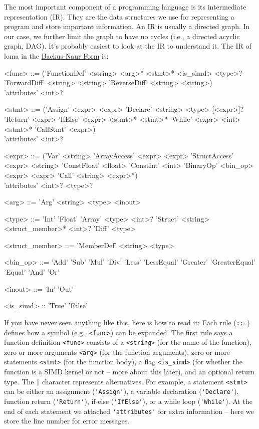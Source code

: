 The most important component of a programming language is its intermediate representation (IR). They are the data structures we use for representing a program and store important information. An IR is usually a directed graph. In our case, we further limit the graph to have no cycles (i.e., a directed acyclic graph, DAG). It's probably easiest to look at the IR to understand it. 
The IR of loma in the \href{https://en.wikipedia.org/wiki/Backus%E2%80%93Naur_form}{Backus-Naur Form} is:
\begin{grammar}
<func> ::= ('FunctionDef' <string> <arg>* <stmt>* <is_simd> <type>?
\alt 'ForwardDiff' <string> <string>
\alt 'ReverseDiff' <string> <string>) \\
'attributes' <int>?

<stmt> ::= ('Assign' <expr> <expr>
\alt 'Declare' <string> <type> [<expr>]? 
\alt 'Return' <expr>
\alt 'IfElse' <expr> <stmt>* <stmt>*
\alt 'While' <expr> <int> <stmt>*
\alt 'CallStmt' <expr>) \\
'attributes' <int>?

<expr> ::= ('Var' <string>
\alt 'ArrayAccess' <expr> <expr>
\alt 'StructAccess' <expr> <string>
\alt 'ConstFloat' <float>
\alt 'ConstInt' <int>
\alt 'BinaryOp' <bin_op> <expr> <expr>
\alt 'Call' <string> <expr>*) \\
'attributes' <int>? <type>?

<arg> ::= 'Arg' <string> <type> <inout>

<type> ::= 'Int'
\alt 'Float'
\alt 'Array' <type> <int>?
\alt 'Struct' <string> <struct_member>* <int>?
\alt 'Diff' <type>

<struct_member> ::= 'MemberDef' <string> <type>

<bin_op> ::= 'Add'
\alt 'Sub'
\alt 'Mul'
\alt 'Div'
\alt 'Less'
\alt 'LessEqual'
\alt 'Greater'
\alt 'GreaterEqual'
\alt 'Equal'
\alt 'And'
\alt 'Or'

<inout> ::= 'In' \alt 'Out'

<is_simd> :: 'True' \alt 'False'
\end{grammar}

If you have never seen anything like this, here is how to read it:
Each rule (\lstinline{::=}) defines how a symbol (e.g., \lstinline{<func>}) can be expanded. The first rule says a function definition \lstinline{<func>} consists of a \lstinline{<string>} (for the name of the function), zero or more arguments \lstinline{<arg>} (for the function arguments), zero or more statements \lstinline{<stmt>} (for the function body), a flag \lstinline{<is_simd>} (for whether the function is a SIMD kernel or not -- more about this later), and an optional return type. The \lstinline{|} character represents alternatives. For example, a statement \lstinline{<stmt>} can be either an assignment (\lstinline{'Assign'}), a variable declaration (\lstinline{'Declare'}), function return (\lstinline{'Return'}), if-else (\lstinline{'IfElse'}), or a while loop (\lstinline{'While'}). At the end of each statement we attached \lstinline{'attributes'} for extra information -- here we store the line number for error messages.

